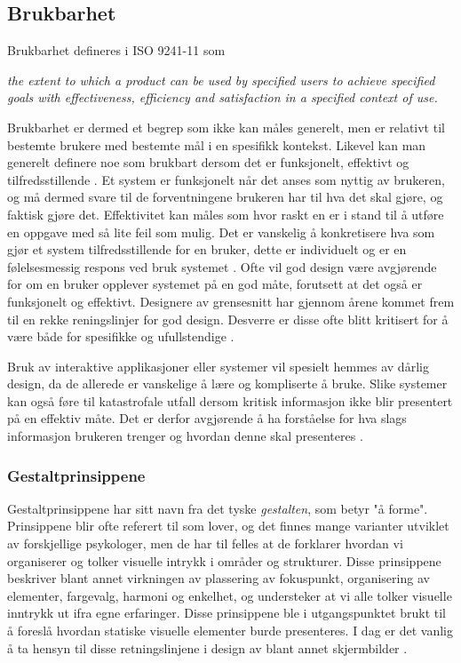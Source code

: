 \subsection{Brukbarhet}
\label{chp: brukbarhet}

Brukbarhet defineres i ISO 9241-11 \cite{Svanes08} som

\noindent
\begin{otherlanguage}{english}
\emph{the extent to which a product can be used by specified users to achieve specified goals with effectiveness, efficiency and satisfaction in a specified context of use.}
\end{otherlanguage}

\noindent
Brukbarhet er dermed et begrep som ikke kan måles generelt, men er relativt til bestemte brukere med bestemte mål i en spesifikk kontekst. Likevel kan man generelt definere noe som brukbart dersom det er funksjonelt, effektivt og tilfredsstillende \cite{Kuniavsky}. Et system er funksjonelt når det anses som nyttig av brukeren, og må dermed svare til de forventningene brukeren har til hva det skal gjøre, og faktisk gjøre det. Effektivitet kan måles som hvor raskt en er i stand til å utføre en oppgave med så lite feil som mulig. Det er vanskelig å konkretisere hva som gjør et system tilfredsstillende for en bruker, dette er individuelt og er en følelsesmessig respons ved bruk systemet \cite{Kuniavsky}. Ofte vil god design være avgjørende for om en bruker opplever systemet på en god måte, forutsett at det også er funksjonelt og effektivt. Designere av grensesnitt har gjennom årene kommet frem til en rekke reningslinjer for god design. Desverre er disse ofte blitt kritisert for å være både for spesifikke og ufullstendige \cite{mmi}. 

\noindent
Bruk av interaktive applikasjoner eller systemer vil spesielt hemmes av dårlig design, da de allerede er vanskelige å lære og kompliserte å bruke. Slike systemer kan også føre til katastrofale utfall dersom kritisk informasjon ikke blir presentert på en effektiv måte. Det er derfor avgjørende å ha forståelse for hva slags informasjon brukeren trenger og hvordan denne skal presenteres \cite{Ebright10}. 

\subsubsection{Gestaltprinsippene}
Gestaltprinsippene har sitt navn fra det tyske \emph{gestalten}, som betyr "å forme". Prinsippene blir ofte referert til som lover, og det finnes mange varianter utviklet av forskjellige psykologer, men de har til felles at de forklarer hvordan vi organiserer og tolker visuelle intrykk i områder og strukturer. Disse prinsippene beskriver blant annet virkningen av plassering av fokuspunkt, organisering av elementer, fargevalg, harmoni og enkelhet, og understeker at vi alle tolker visuelle inntrykk ut ifra egne erfaringer. 
Disse prinsippene ble i utgangspunktet brukt til å foreslå hvordan statiske visuelle elementer burde presenteres. I dag er det vanlig å ta hensyn til disse retningslinjene i design av blant annet skjermbilder \cite{Chang02}. 

